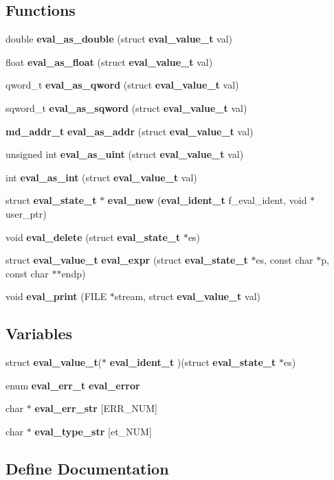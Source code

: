 \subsection*{Functions}
\begin{CompactItemize}
\item 
double {\bf eval\_\-as\_\-double} (struct {\bf eval\_\-value\_\-t} val)
\item 
float {\bf eval\_\-as\_\-float} (struct {\bf eval\_\-value\_\-t} val)
\item 
qword\_\-t {\bf eval\_\-as\_\-qword} (struct {\bf eval\_\-value\_\-t} val)
\item 
sqword\_\-t {\bf eval\_\-as\_\-sqword} (struct {\bf eval\_\-value\_\-t} val)
\item 
{\bf md\_\-addr\_\-t} {\bf eval\_\-as\_\-addr} (struct {\bf eval\_\-value\_\-t} val)
\item 
unsigned int {\bf eval\_\-as\_\-uint} (struct {\bf eval\_\-value\_\-t} val)
\item 
int {\bf eval\_\-as\_\-int} (struct {\bf eval\_\-value\_\-t} val)
\item 
struct {\bf eval\_\-state\_\-t} $\ast$ {\bf eval\_\-new} ({\bf eval\_\-ident\_\-t} f\_\-eval\_\-ident, void $\ast$user\_\-ptr)
\item 
void {\bf eval\_\-delete} (struct {\bf eval\_\-state\_\-t} $\ast$es)
\item 
struct {\bf eval\_\-value\_\-t} {\bf eval\_\-expr} (struct {\bf eval\_\-state\_\-t} $\ast$es, const char $\ast$p, const char $\ast$$\ast$endp)
\item 
void {\bf eval\_\-print} (FILE $\ast$stream, struct {\bf eval\_\-value\_\-t} val)
\end{CompactItemize}
\subsection*{Variables}
\begin{CompactItemize}
\item 
struct {\bf eval\_\-value\_\-t}($\ast$ {\bf eval\_\-ident\_\-t} )(struct {\bf eval\_\-state\_\-t} $\ast$es)
\item 
enum {\bf eval\_\-err\_\-t} {\bf eval\_\-error}
\item 
char $\ast$ {\bf eval\_\-err\_\-str} [ERR\_\-NUM]
\item 
char $\ast$ {\bf eval\_\-type\_\-str} [et\_\-NUM]
\end{CompactItemize}


\subsection{Define Documentation}
